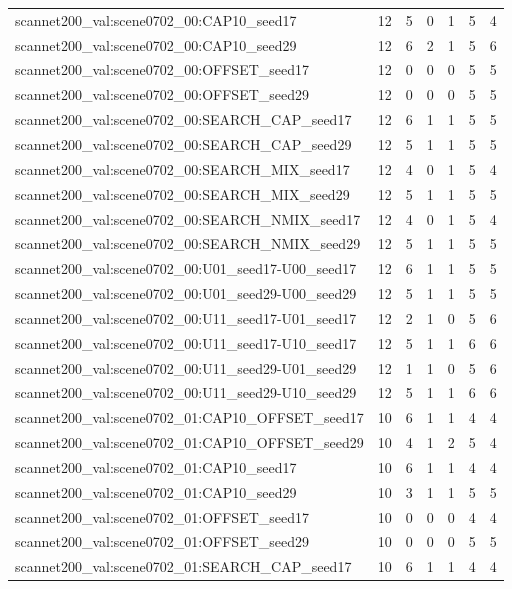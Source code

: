 \begin{table}[t]
\begin{tabular}{lrrrrrr}
scannet200\_val:scene0702\_00:CAP10\_seed17 & 12 & 5 & 0 & 1 & 5 & 4 \\
scannet200\_val:scene0702\_00:CAP10\_seed29 & 12 & 6 & 2 & 1 & 5 & 6 \\
scannet200\_val:scene0702\_00:OFFSET\_seed17 & 12 & 0 & 0 & 0 & 5 & 5 \\
scannet200\_val:scene0702\_00:OFFSET\_seed29 & 12 & 0 & 0 & 0 & 5 & 5 \\
scannet200\_val:scene0702\_00:SEARCH\_CAP\_seed17 & 12 & 6 & 1 & 1 & 5 & 5 \\
scannet200\_val:scene0702\_00:SEARCH\_CAP\_seed29 & 12 & 5 & 1 & 1 & 5 & 5 \\
scannet200\_val:scene0702\_00:SEARCH\_MIX\_seed17 & 12 & 4 & 0 & 1 & 5 & 4 \\
scannet200\_val:scene0702\_00:SEARCH\_MIX\_seed29 & 12 & 5 & 1 & 1 & 5 & 5 \\
scannet200\_val:scene0702\_00:SEARCH\_NMIX\_seed17 & 12 & 4 & 0 & 1 & 5 & 4 \\
scannet200\_val:scene0702\_00:SEARCH\_NMIX\_seed29 & 12 & 5 & 1 & 1 & 5 & 5 \\
scannet200\_val:scene0702\_00:U01\_seed17-U00\_seed17 & 12 & 6 & 1 & 1 & 5 & 5 \\
scannet200\_val:scene0702\_00:U01\_seed29-U00\_seed29 & 12 & 5 & 1 & 1 & 5 & 5 \\
scannet200\_val:scene0702\_00:U11\_seed17-U01\_seed17 & 12 & 2 & 1 & 0 & 5 & 6 \\
scannet200\_val:scene0702\_00:U11\_seed17-U10\_seed17 & 12 & 5 & 1 & 1 & 6 & 6 \\
scannet200\_val:scene0702\_00:U11\_seed29-U01\_seed29 & 12 & 1 & 1 & 0 & 5 & 6 \\
scannet200\_val:scene0702\_00:U11\_seed29-U10\_seed29 & 12 & 5 & 1 & 1 & 6 & 6 \\
scannet200\_val:scene0702\_01:CAP10\_OFFSET\_seed17 & 10 & 6 & 1 & 1 & 4 & 4 \\
scannet200\_val:scene0702\_01:CAP10\_OFFSET\_seed29 & 10 & 4 & 1 & 2 & 5 & 4 \\
scannet200\_val:scene0702\_01:CAP10\_seed17 & 10 & 6 & 1 & 1 & 4 & 4 \\
scannet200\_val:scene0702\_01:CAP10\_seed29 & 10 & 3 & 1 & 1 & 5 & 5 \\
scannet200\_val:scene0702\_01:OFFSET\_seed17 & 10 & 0 & 0 & 0 & 4 & 4 \\
scannet200\_val:scene0702\_01:OFFSET\_seed29 & 10 & 0 & 0 & 0 & 5 & 5 \\
scannet200\_val:scene0702\_01:SEARCH\_CAP\_seed17 & 10 & 6 & 1 & 1 & 4 & 4 \\

\end{tabular}
\end{table}
